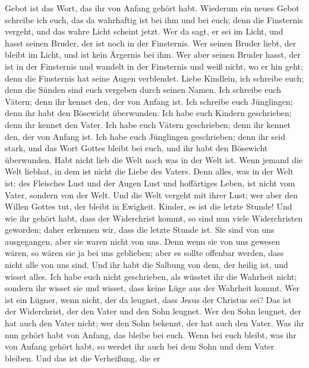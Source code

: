 Gebot ist das Wort, das ihr von Anfang gehört habt. 
Wiederum ein neues Gebot schreibe ich euch, das da wahrhaftig ist bei
ihm und bei euch; denn die Finsternis vergeht, und das wahre Licht
scheint jetzt.  Wer da sagt, er sei im Licht, und hasst
seinen Bruder, der ist noch in der Finsternis.  Wer seinen
Bruder liebt, der bleibt im Licht, und ist kein Ärgernis bei ihm.
 Wer aber seinen Bruder hasst, der ist in der Finsternis
und wandelt in der Finsternis und weiß nicht, wo er hin geht; denn die
Finsternis hat seine Augen verblendet.  Liebe Kindlein, ich
schreibe euch; denn die Sünden sind euch vergeben durch seinen Namen.
 Ich schreibe euch Vätern; denn ihr kennet den, der von
Anfang ist. Ich schreibe euch Jünglingen; denn ihr habt den Bösewicht
überwunden.  Ich habe euch Kindern geschrieben; denn ihr
kennet den Vater. Ich habe euch Vätern geschrieben; denn ihr kennet den,
der von Anfang ist. Ich habe euch Jünglingen geschrieben; denn ihr seid
stark, und das Wort Gottes bleibt bei euch, und ihr habt den Bösewicht
überwunden.  Habt nicht lieb die Welt noch was in der Welt
ist. Wenn jemand die Welt liebhat, in dem ist nicht die Liebe des
Vaters.  Denn alles, was in der Welt ist: des Fleisches
Lust und der Augen Lust und hoffärtiges Leben, ist nicht vom Vater,
sondern von der Welt.  Und die Welt vergeht mit ihrer Lust;
wer aber den Willen Gottes tut, der bleibt in Ewigkeit. 
Kinder, es ist die letzte Stunde! Und wie ihr gehört habt, dass der
Widerchrist kommt, so sind nun viele Widerchristen geworden; daher
erkennen wir, dass die letzte Stunde ist.  Sie sind von uns
ausgegangen, aber sie waren nicht von uns. Denn wenn sie von uns gewesen
wären, so wären sie ja bei uns geblieben; aber es sollte offenbar
werden, dass nicht alle von uns sind.  Und ihr habt die
Salbung von dem, der heilig ist, und wisset alles.  Ich
habe euch nicht geschrieben, als wüsstet ihr die Wahrheit nicht; sondern
ihr wisset sie und wisset, dass keine Lüge aus der Wahrheit kommt.
 Wer ist ein Lügner, wenn nicht, der da leugnet, dass Jesus
der Christus sei? Das ist der Widerchrist, der den Vater und den Sohn
leugnet.  Wer den Sohn leugnet, der hat auch den Vater
nicht; wer den Sohn bekennt, der hat auch den Vater.  Was
ihr nun gehört habt von Anfang, das bleibe bei euch. Wenn bei euch
bleibt, was ihr von Anfang gehört habt, so werdet ihr auch bei dem Sohn
und dem Vater bleiben.  Und das ist die Verheißung, die er

